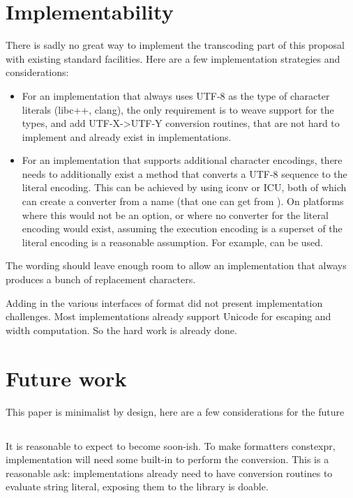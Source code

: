 \documentclass{wg21}
\begin{document}
\section{Implementability}

There is sadly no great way to implement the transcoding part of this proposal with existing standard facilities.
Here are a few implementation strategies and considerations:

\begin{itemize}
\item For an implementation that always uses UTF-8 as the type of character literals (libc++, clang), the only requirement is to weave support for the types,
and add UTF-X->UTF-Y conversion routines, that are not hard to implement and already exist in implementations.
\item For an implementation that supports additional character encodings, there needs to additionally exist a method that converts a UTF-8 sequence to the
literal encoding.
This can be achieved by using iconv or ICU, both of which can create a converter from a name (that one can get from ).
On platforms where this would not be an option, or where no converter for the literal encoding would exist, assuming the execution encoding is a superset
of the literal encoding is a reasonable assumption. For example,  can be used.
\end{itemize}

The wording should leave enough room to allow an implementation that always produces a bunch of replacement characters.

Adding  in the various interfaces of format did not present implementation challenges.
Most implementations already support Unicode for escaping and width computation. So the hard work is already done.

\section{Future work}

This paper is minimalist by design, here are a few considerations for the future

\subsection{}

It is reasonable to expect  to become  soon-ish.
To make  formatters constexpr, implementation will need some built-in to perform the conversion.
This is a reasonable ask: implementations already need to have conversion routines to evaluate string literal, exposing them to the library
is doable.
\end{document}

